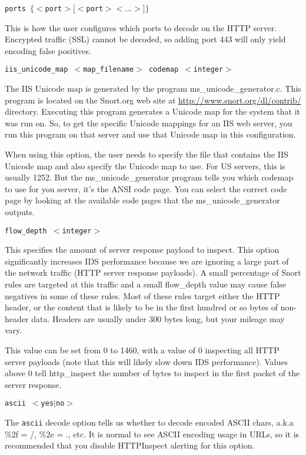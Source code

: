 \documentclass[english]{report}
\newcounter{slistnum}
\newenvironment{slist}
{ \begin{list}{ {\bf \arabic{slistnum}.} }{\usecounter{slistnum} } }
{ \end{list} }
\begin{document}
\begin{slist}
\item \texttt{ports $\{ <$port$> [<$port$> <...>] \}$}

This is how the user configures which ports to decode on the HTTP server.
Encrypted traffic (SSL) cannot be decoded, so adding port 443 will only
yield encoding false positives.

\item \texttt{iis\_unicode\_map $<$map\_filename$>$ codemap $<$integer$>$}

The IIS Unicode map is generated by the program ms\_unicode\_generator.c.  This
program is located on the Snort.org web site at \url{http://www.snort.org/dl/contrib/}
directory.  Executing this program
generates a Unicode map for the system that it was run on.  So, to get the
specific Unicode mappings for an IIS web server, you run this program on that
server and use that Unicode map in this configuration.

When using this option, the user needs to specify the file that contains the
IIS Unicode map and also specify the Unicode map to use.  For US servers, this
is usually 1252.  But the ms\_unicode\_generator program tells you which codemap
to use for you server, it's the ANSI code page.  You can select the correct code
page by looking at the available code pages that the ms\_unicode\_generator
outputs.

\item \texttt{flow\_depth $<$integer$>$}

This specifies the amount of server response payload to inspect.  This option
significantly increases IDS performance because we are ignoring a large part of
the network traffic (HTTP server response payloads).  A small percentage of
Snort rules are targeted at this traffic and a small flow\_depth value may
cause false negatives in some of these rules.  Most of these rules target
either the HTTP header, or the content that is likely to be in the first
hundred or so bytes of non-header data.  Headers are usually under 300 bytes
long, but your mileage may vary.

This value can be set from 0 to 1460, with a value of 0 inspecting all HTTP
server payloads (note that this will likely slow down IDS performance).  Values
above 0 tell http\_inspect the number of bytes to inspect in the first packet
of the server response.

\item \texttt{ascii $<$yes$|$no$>$}

The \texttt{ascii} decode option tells us whether to decode encoded ASCII chars, a.k.a
\%2f = /, \%2e = ., etc.  It is normal to see ASCII encoding usage in URLs, so it
is recommended that you disable HTTPInspect alerting for this option.


\end{slist}
\end{document}

